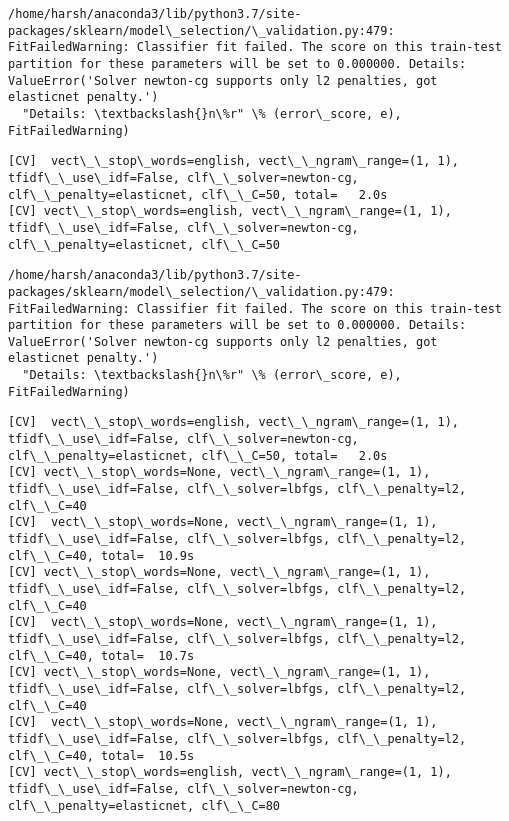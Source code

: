\documentclass[11pt]{article}
\begin{document}
    \begin{Verbatim}[commandchars=\\\{\}]
/home/harsh/anaconda3/lib/python3.7/site-packages/sklearn/model\_selection/\_validation.py:479: FitFailedWarning: Classifier fit failed. The score on this train-test partition for these parameters will be set to 0.000000. Details: 
ValueError('Solver newton-cg supports only l2 penalties, got elasticnet penalty.')
  "Details: \textbackslash{}n\%r" \% (error\_score, e), FitFailedWarning)

    \end{Verbatim}

    \begin{Verbatim}[commandchars=\\\{\}]
[CV]  vect\_\_stop\_words=english, vect\_\_ngram\_range=(1, 1), tfidf\_\_use\_idf=False, clf\_\_solver=newton-cg, clf\_\_penalty=elasticnet, clf\_\_C=50, total=   2.0s
[CV] vect\_\_stop\_words=english, vect\_\_ngram\_range=(1, 1), tfidf\_\_use\_idf=False, clf\_\_solver=newton-cg, clf\_\_penalty=elasticnet, clf\_\_C=50 

    \end{Verbatim}

    \begin{Verbatim}[commandchars=\\\{\}]
/home/harsh/anaconda3/lib/python3.7/site-packages/sklearn/model\_selection/\_validation.py:479: FitFailedWarning: Classifier fit failed. The score on this train-test partition for these parameters will be set to 0.000000. Details: 
ValueError('Solver newton-cg supports only l2 penalties, got elasticnet penalty.')
  "Details: \textbackslash{}n\%r" \% (error\_score, e), FitFailedWarning)

    \end{Verbatim}

    \begin{Verbatim}[commandchars=\\\{\}]
[CV]  vect\_\_stop\_words=english, vect\_\_ngram\_range=(1, 1), tfidf\_\_use\_idf=False, clf\_\_solver=newton-cg, clf\_\_penalty=elasticnet, clf\_\_C=50, total=   2.0s
[CV] vect\_\_stop\_words=None, vect\_\_ngram\_range=(1, 1), tfidf\_\_use\_idf=False, clf\_\_solver=lbfgs, clf\_\_penalty=l2, clf\_\_C=40 
[CV]  vect\_\_stop\_words=None, vect\_\_ngram\_range=(1, 1), tfidf\_\_use\_idf=False, clf\_\_solver=lbfgs, clf\_\_penalty=l2, clf\_\_C=40, total=  10.9s
[CV] vect\_\_stop\_words=None, vect\_\_ngram\_range=(1, 1), tfidf\_\_use\_idf=False, clf\_\_solver=lbfgs, clf\_\_penalty=l2, clf\_\_C=40 
[CV]  vect\_\_stop\_words=None, vect\_\_ngram\_range=(1, 1), tfidf\_\_use\_idf=False, clf\_\_solver=lbfgs, clf\_\_penalty=l2, clf\_\_C=40, total=  10.7s
[CV] vect\_\_stop\_words=None, vect\_\_ngram\_range=(1, 1), tfidf\_\_use\_idf=False, clf\_\_solver=lbfgs, clf\_\_penalty=l2, clf\_\_C=40 
[CV]  vect\_\_stop\_words=None, vect\_\_ngram\_range=(1, 1), tfidf\_\_use\_idf=False, clf\_\_solver=lbfgs, clf\_\_penalty=l2, clf\_\_C=40, total=  10.5s
[CV] vect\_\_stop\_words=english, vect\_\_ngram\_range=(1, 1), tfidf\_\_use\_idf=False, clf\_\_solver=newton-cg, clf\_\_penalty=elasticnet, clf\_\_C=80 

    \end{Verbatim}
\end{document}
